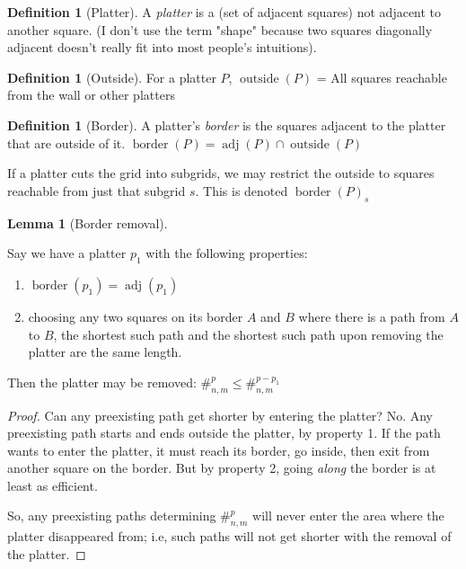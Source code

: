 \documentclass{article}
\theoremstyle{definition}%
\newtheorem{lemma}[theorem]{Lemma}
\newtheorem{definition}[theorem]{Definition}
\newcommand{\newterm}[1]{\textit{#1}}
\newcommand{\adj}{\operatorname{adj}}
\newcommand{\border}{\operatorname{border}}
\newcommand{\outside}{\operatorname{outside}}
\begin{document}
\begin{definition}[Platter]
A \newterm{platter} is a (set of adjacent squares) not adjacent to another square. (I don't use the term "shape" because two squares diagonally adjacent doesn't really fit into most people's intuitions).%
\end{definition}

\begin{definition}[Outside]
For a platter $P$, $\outside(P)$ = All squares reachable from the wall or other platters
\end{definition}

\begin{definition}[Border]
A platter's \newterm{border} is the squares adjacent to the platter that are outside of it. $\border(P) = \adj(P) \cap \outside(P)$

If a platter cuts the grid into subgrids, we may restrict the outside to squares reachable from just that subgrid $s$. This is denoted $\border(P)_s$
\end{definition}

\begin{lemma}[Border removal]
\label{lem:Border removal}

Say we have a platter $p_1$ with the following properties:

\begin{enumerate}
\item $\border(p_1) = \adj(p_1)$
\item choosing any two squares on its border $A$ and $B$ where there is a path from $A$ to $B$, the shortest such path and the shortest such path upon removing the platter are the same length.
\end{enumerate}

Then the platter may be removed: $\#^{p}_{n, m} \le \#^{p - p_1}_{n, m}$
\end{lemma}

\begin{proof}
Can any preexisting path get shorter by entering the platter? No. Any preexisting path starts and ends outside the platter, by property 1. If the path wants to enter the platter, it must reach its border, go inside, then exit from another square on the border. But by property 2, going \emph{along} the border is at least as efficient.

So, any preexisting paths determining $\#^{p}_{n, m}$ will never enter the area where the platter disappeared from; i.e, such paths will not get shorter with the removal of the platter.
\end{proof}
\end{document}
